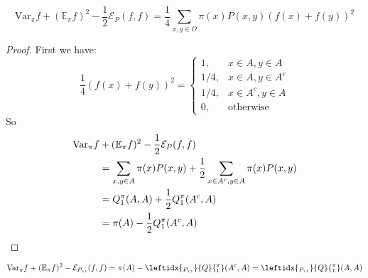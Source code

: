 \begin{fact}
  \[\mathrm{Var}_\pi f + (\mathbb{E}_\pi f)^2 - \frac{1}{2}\mathcal{E}_P(f, f) = \frac{1}{4}\sum_{x, y\in\Omega}\pi(x)P(x,y)(f(x) + f(y))^2\]
\end{fact}
\begin{proof}
  First we have:
  \[
    \frac{1}{4}(f(x) + f(y))^2 = \left\{
      \begin{array}{lr}
        1, & x\in A, y\in A \\
        1/4, & x\in A, y\in A^c \\
        1/4, & x\in A^c, y\in A \\
        0, & \mbox{otherwise}
      \end{array}
    \right.
  \]
  So
  \begin{align*}
    \mathrm{Var}_\pi f &+ (\mathbb{E}_\pi f)^2 - \frac{1}{2}\mathcal{E}_P(f, f) \\
    &= \sum_{x, y\in A} \pi(x)P(x,y) + \frac{1}{2}\sum_{x\in A^c, y\in A} \pi(x)P(x,y) \\
    &= Q_1^\pi(A, A) + \frac{1}{2}Q_1^\pi(A^c, A) \\
    &= \pi(A) - \frac{1}{2}Q_1^\pi(A^c, A) \qedhere
  \end{align*}
\end{proof}
\begin{corollary}[\label{coro:Q1(A,A)}]
  \[\mathrm{Var}_\pi f + (\mathbb{E}_\pi f)^2 - \mathcal{E}_{P_{zz}}(f, f) = \pi(A) - \leftidx{_{P_{zz}}}{Q}{_1^\pi}(A^c, A) = \leftidx{_{P_{zz}}}{Q}{_1^\pi}(A, A)\]
\end{corollary}

